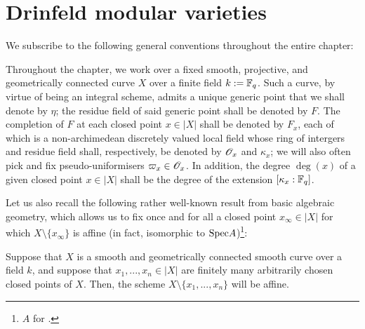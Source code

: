 \chapter{Drinfeld modular varieties}
    \begin{abstract}
        
    \end{abstract}
    
    We subscribe to the following general conventions throughout the entire chapter:
    \begin{convention}
        Throughout the chapter, we work over a fixed smooth, projective, and geometrically connected curve $X$ over a finite field $k := \mathbb{F}_q$. Such a curve, by virtue of being an integral scheme, admits a unique generic point that we shall denote by $\eta$; the residue field of said generic point shall be denoted by $F$. The completion of $F$ at each closed point $x \in |X|$ shall be denoted by $F_x$, each of which is a non-archimedean discretely valued local field whose ring of intergers and residue field shall, respectively, be denoted by $\mathscr{O}_x$ and $\kappa_x$; we will also often pick and fix pseudo-uniformisers $\varpi_x \in \mathscr{O}_x$. In addition, the degree $\deg(x)$ of a given closed point $x \in |X|$ shall be the degree of the extension $[\kappa_x : \mathbb{F}_q]$. 
    \end{convention}
    
    Let us also recall the following rather well-known result from basic algebraic geometry, which allows us to fix once and for all a closed point $x_{\infty} \in |X|$ for which $X \setminus \{x_{\infty}\}$ is affine (in fact, isomorphic to $\mathrm{Spec} A$)\footnote{$A$ for .}:
    \begin{proposition}
        Suppose that $X$ is a smooth and geometrically connected smooth curve over a field $k$, and suppose that $x_1, ..., x_n \in |X|$ are finitely many arbitrarily chosen closed points of $X$. Then, the scheme $X \setminus \{x_1, ..., x_n\}$ will be affine.  
    \end{proposition}
    
